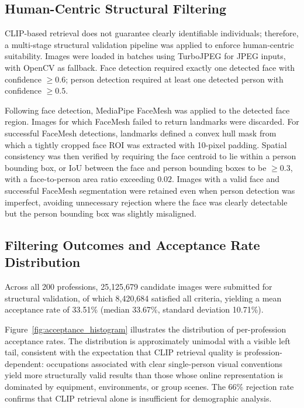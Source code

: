 \subsection{Human-Centric Structural Filtering}
\label{subsec:structural_validation_retrieval}

CLIP-based retrieval does not guarantee clearly identifiable individuals; therefore, a multi-stage structural validation pipeline was applied to enforce human-centric suitability. Images were loaded in batches using TurboJPEG for JPEG inputs, with OpenCV as fallback. Face detection required exactly one detected face with confidence $\geq 0.6$; person detection required at least one detected person with confidence $\geq 0.5$.

Following face detection, MediaPipe FaceMesh was applied to the detected face region. Images for which FaceMesh failed to return landmarks were discarded. For successful FaceMesh detections, landmarks defined a convex hull mask from which a tightly cropped face ROI was extracted with 10-pixel padding. Spatial consistency was then verified by requiring the face centroid to lie within a person bounding box, or IoU between the face and person bounding boxes to be $\geq 0.3$, with a face-to-person area ratio exceeding $0.02$. Images with a valid face and successful FaceMesh segmentation were retained even when person detection was imperfect, avoiding unnecessary rejection where the face was clearly detectable but the person bounding box was slightly misaligned.

\subsection{Filtering Outcomes and Acceptance Rate Distribution}
\label{subsec:filtering_outcomes}

Across all 200 professions, 25,125,679 candidate images were submitted for structural validation, of which 8,420,684 satisfied all criteria, yielding a mean acceptance rate of 33.51\% (median 33.67\%, standard deviation 10.71\%).

Figure~\ref{fig:acceptance_histogram} illustrates the distribution of per-profession acceptance rates. The distribution is approximately unimodal with a visible left tail, consistent with the expectation that CLIP retrieval quality is profession-dependent: occupations associated with clear single-person visual conventions yield more structurally valid results than those whose online representation is dominated by equipment, environments, or group scenes. The 66\% rejection rate confirms that CLIP retrieval alone is insufficient for demographic analysis.

